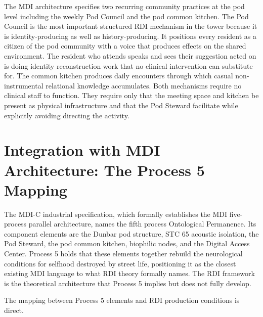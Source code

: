 \documentclass[12pt, letterpaper]{article}
\begin{document}
The MDI architecture specifies two recurring community practices at the pod level including the weekly Pod Council and the pod common kitchen. The Pod Council is the most important structured RDI mechanism in the tower because it is identity-producing as well as history-producing. It positions every resident as a citizen of the pod community with a voice that produces effects on the shared environment. The resident who attends speaks and sees their suggestion acted on is doing identity reconstruction work that no clinical intervention can substitute for. The common kitchen produces daily encounters through which casual non-instrumental relational knowledge accumulates. Both mechanisms require no clinical staff to function. They require only that the meeting space and kitchen be present as physical infrastructure and that the Pod Steward facilitate while explicitly avoiding directing the activity.


\clearpage
\section{Integration with MDI Architecture: The Process 5 Mapping}

The MDI-C industrial specification, which formally establishes the MDI five-process parallel architecture, names the fifth process Ontological Permanence. Its component elements are the Dunbar pod structure, STC 65 acoustic isolation, the Pod Steward, the pod common kitchen, biophilic nodes, and the Digital Access Center. Process 5 holds that these elements together rebuild the neurological conditions for selfhood destroyed by street life, positioning it as the closest existing MDI language to what RDI theory formally names. The RDI framework is the theoretical architecture that Process 5 implies but does not fully develop.

The mapping between Process 5 elements and RDI production conditions is direct.
\end{document}
